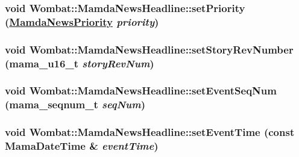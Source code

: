 \hypertarget{classWombat_1_1MamdaNewsHeadline_0b2ad6e39331fb6952d6e3ef973fc1cb}{
\subsubsection[setPriority]{\setlength{\rightskip}{0pt plus 5cm}void Wombat::Mamda\-News\-Headline::set\-Priority (\hyperlink{namespaceWombat_faa7709d230f261c8aeb71420f6dd012}{Mamda\-News\-Priority} {\em priority})}}
\label{classWombat_1_1MamdaNewsHeadline_0b2ad6e39331fb6952d6e3ef973fc1cb}


\hypertarget{classWombat_1_1MamdaNewsHeadline_d7455e7f87ace2006dea7c29d0ca83ea}{
\subsubsection[setStoryRevNumber]{\setlength{\rightskip}{0pt plus 5cm}void Wombat::Mamda\-News\-Headline::set\-Story\-Rev\-Number (mama\_\-u16\_\-t {\em story\-Rev\-Num})}}
\label{classWombat_1_1MamdaNewsHeadline_d7455e7f87ace2006dea7c29d0ca83ea}


\hypertarget{classWombat_1_1MamdaNewsHeadline_1a77a9c1f31e93b328ededf976e4cb6d}{
\subsubsection[setEventSeqNum]{\setlength{\rightskip}{0pt plus 5cm}void Wombat::Mamda\-News\-Headline::set\-Event\-Seq\-Num (mama\_\-seqnum\_\-t {\em seq\-Num})}}
\label{classWombat_1_1MamdaNewsHeadline_1a77a9c1f31e93b328ededf976e4cb6d}


\hypertarget{classWombat_1_1MamdaNewsHeadline_ff354d357230eb98bf105fbe10cecfce}{
\subsubsection[setEventTime]{\setlength{\rightskip}{0pt plus 5cm}void Wombat::Mamda\-News\-Headline::set\-Event\-Time (const Mama\-Date\-Time \& {\em event\-Time})}}
\label{classWombat_1_1MamdaNewsHeadline_ff354d357230eb98bf105fbe10cecfce}


